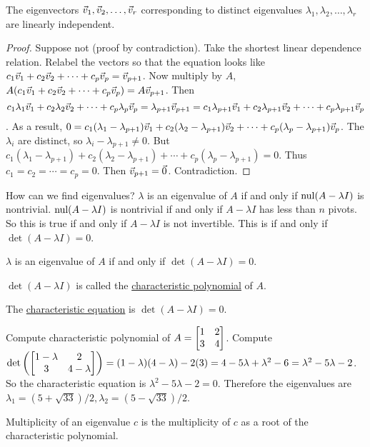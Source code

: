 \documentclass[10pt,a4paper]{article}
\begin{document}
\begin{theorem}
	The eigenvectors $\vec{v}_1,\vec{v}_2,\dots,\vec{v}_r$ corresponding to distinct eigenvalues $\lambda_1,\lambda_2,\dots,\lambda_r$ are linearly independent.
\end{theorem}
\begin{proof}
	Suppose not (proof by contradiction). Take the shortest linear dependence relation. Relabel the vectors so that the equation looks like $c_1\vec{v}_1 + c_2\vec{v}_2+\cdots+c_p\vec{v}_p = \vec{v}_{p+1}$. Now multiply by $A$, $A(c_1\vec{v}_1 + c_2\vec{v}_2+\cdots+c_p\vec{v}_p) = A\vec{v}_{p+1}$. Then $$c_1\lambda_1\vec{v}_1 + c_2\lambda_2\vec{v}_2+\cdots+c_p\lambda_p\vec{v}_p = \lambda_{p+1}\vec{v}_{p+1} = c_1\lambda_{p+1}\vec{v}_1 + c_2\lambda_{p+1}\vec{v}_2+\cdots+c_p\lambda_{p+1}\vec{v}_p$$.
	As a result, $0 = c_1(\lambda_1-\lambda_{p+1})\vec{v}_1 + c_2(\lambda_2-\lambda_{p+1})\vec{v}_2+\cdots+c_p(\lambda_p-\lambda_{p+1})\vec{v}_p$. The $\lambda_i$ are distinct, so $\lambda_i - \lambda_{p+1}\neq 0$. But $c_1(\lambda_1-\lambda_{p+1}) + c_2(\lambda_2-\lambda_{p+1})+\cdots+c_p(\lambda_p-\lambda_{p+1}) = 0$. Thus $c_1=c_2=\cdots=c_p=0$. Then $\vec{v}_{p+1}=\vec{0}$. Contradiction.
\end{proof}
How can we find eigenvalues? 
$\lambda$ is an eigenvalue of $A$ if and only if $\text{nul}(A-\lambda I)$ is nontrivial. $\text{nul}(A-\lambda I)$ is nontrivial if and only if $A-\lambda I$ has less than $n$ pivots. So this is true if and only if $A-\lambda I$ is not invertible. This is if and only if $\det(A-\lambda I) = 0$.
\begin{theorem}
	$\lambda$ is an eigenvalue of $A$ if and only if $\det(A-\lambda I) = 0$.
\end{theorem}
\begin{definition}
	$\det(A-\lambda I)$ is called the \underline{characteristic polynomial} of $A$.
\end{definition}
\begin{definition}
	The \underline{characteristic equation} is $\det(A-\lambda I) = 0$.
\end{definition}
\begin{example}
	Compute characteristic polynomial of $A = \begin{bmatrix}1&2\\3&4\end{bmatrix}$. Compute $\det\left(\begin{bmatrix}1-\lambda & 2 \\ 3&4-\lambda\end{bmatrix}\right) = (1-\lambda)(4-\lambda)-2(3) = 4-5\lambda+\lambda^2-6 = \lambda^2-5\lambda-2$. So the characteristic equation is $\lambda^2-5\lambda-2=0$. Therefore the eigenvalues are $\lambda_1 = (5+\sqrt{33})/2, \lambda_2=(5-\sqrt{33})/2$.
\end{example}
\begin{definition}
	Multiplicity of an eigenvalue $c$ is the multiplicity of $c$ as a root of the characteristic polynomial.
\end{definition}
\end{document}
